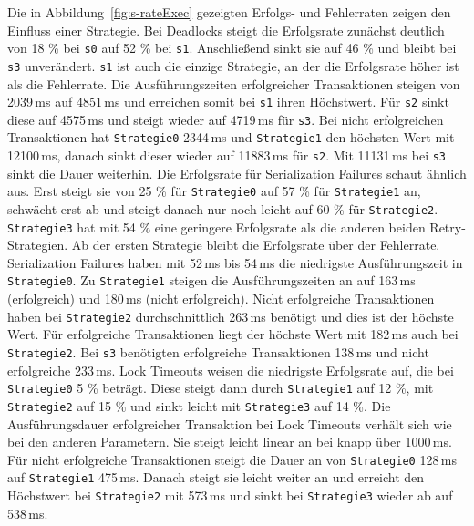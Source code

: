 
Die in Abbildung~\ref{fig:s-rateExec} gezeigten Erfolgs- und Fehlerraten zeigen den Einfluss einer Strategie.
Bei Deadlocks steigt die Erfolgsrate zunächst deutlich von 18\,\,\% bei \texttt{s0} auf 52\,\,\% bei \texttt{s1}.
Anschließend sinkt sie auf 46\,\,\% und bleibt bei \texttt{s3} unverändert.
\texttt{s1} ist auch die einzige Strategie, an der die Erfolgsrate höher ist als die Fehlerrate.
Die Ausführungszeiten erfolgreicher Transaktionen steigen von 2039\,ms auf 4851\,ms und erreichen somit bei \texttt{s1}
ihren Höchstwert.
Für \texttt{s2} sinkt diese auf 4575\,ms und steigt wieder auf 4719\,ms für \texttt{s3}.
Bei nicht erfolgreichen Transaktionen hat \texttt{Strategie0} 2344\,ms und \texttt{Strategie1} den höchsten Wert mit
12100\,ms, danach sinkt dieser wieder auf 11883\,ms für \texttt{s2}.
Mit 11131\,ms bei \texttt{s3} sinkt die Dauer weiterhin.
Die Erfolgsrate für Serialization Failures schaut ähnlich aus.
Erst steigt sie von 25\,\,\% für \texttt{Strategie0} auf 57\,\,\% für \texttt{Strategie1} an, schwächt erst ab und steigt danach
nur noch leicht auf 60\,\,\% für \texttt{Strategie2}.
\texttt{Strategie3} hat mit 54\,\,\% eine geringere Erfolgsrate als die anderen beiden Retry-Strategien.
Ab der ersten Strategie bleibt die Erfolgsrate über der Fehlerrate.
Serialization Failures haben mit 52\,ms bis 54\,ms die niedrigste Ausführungszeit in \texttt{Strategie0}.
Zu \texttt{Strategie1} steigen die Ausführungszeiten an auf 163\,ms (erfolgreich) und 180\,ms (nicht erfolgreich).
Nicht erfolgreiche Transaktionen haben bei \texttt{Strategie2} durchschnittlich 263\,ms benötigt und dies ist der
höchste Wert.
Für erfolgreiche Transaktionen liegt der höchste Wert mit 182\,ms auch bei \texttt{Strategie2}.
Bei \texttt{s3} benötigten erfolgreiche Transaktionen 138\,ms und nicht erfolgreiche 233\,ms.
Lock Timeouts weisen die niedrigste Erfolgsrate auf, die bei \texttt{Strategie0} 5\,\,\% beträgt.
Diese steigt dann durch \texttt{Strategie1} auf 12\,\,\%, mit \texttt{Strategie2} auf 15\,\,\% und sinkt leicht mit
\texttt{Strategie3} auf 14\,\,\%.
Die Ausführungsdauer erfolgreicher Transaktion bei Lock Timeouts verhält sich wie bei den anderen Parametern.
Sie steigt leicht linear an bei knapp über 1000\,ms.
Für nicht erfolgreiche Transaktionen steigt die Dauer an von \texttt{Strategie0} 128\,ms auf \texttt{Strategie1} 475\,ms.
Danach steigt sie leicht weiter an und erreicht den Höchstwert bei \texttt{Strategie2} mit 573\,ms und sinkt bei
\texttt{Strategie3} wieder ab auf 538\,ms.

